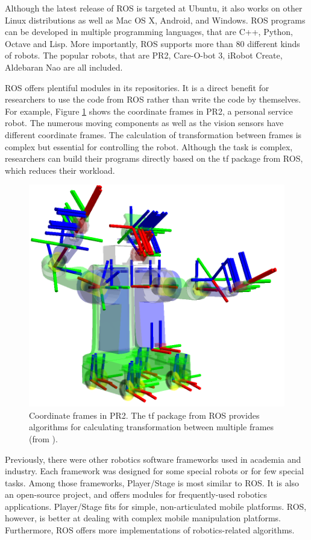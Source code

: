 \documentclass[a4paper, 10pt, conference]{ieeeconf}       %
\begin{document}
Although the latest release of ROS is targeted at Ubuntu, it also works on other Linux distributions as well as Mac OS X, Android, and Windows. ROS programs can be developed in multiple programming languages, that are C++, Python, Octave and Lisp. More importantly, ROS supports more than 80 different kinds of robots. The popular robots, that are PR2, Care-O-bot 3, iRobot Create, Aldebaran Nao are all included.

ROS offers plentiful modules in its repositories. It is a direct benefit for researchers to use the code from ROS rather than write the code by themselves. For example, Figure \ref{fig:tf} shows the coordinate frames in PR2, a personal service robot. The numerous moving components as well as the vision sensors have different coordinate frames. The calculation of transformation between frames is complex but essential for controlling the robot. Although the task is complex, researchers can build their programs directly based on the tf package from ROS, which reduces their workload.

\begin{figure}[htpb]
  \centering
  \includegraphics[width=.48\textwidth]{tf_pr2}
  \caption{Coordinate frames in PR2. The tf package from ROS provides algorithms for calculating transformation between multiple frames (from \cite{_documentation_2013}).}
  \label{fig:tf}
\end{figure}

Previously, there were other robotics software frameworks used in academia and industry\cite{kramer_development_2007}. Each framework was designed for some special robots or for few special tasks. Among those frameworks, Player/Stage\cite{collett_player_2005} is most similar to ROS. It is also an open-source project, and offers modules for frequently-used robotics applications. Player/Stage fits for simple, non-articulated mobile platforms. ROS, however, is better at dealing with complex mobile manipulation platforms. Furthermore, ROS offers more implementations of robotics-related algorithms.
\end{document}
